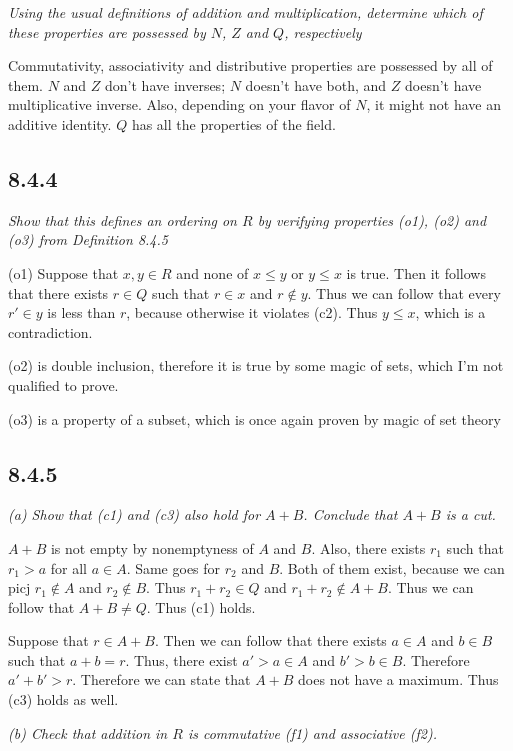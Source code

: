 \documentclass[11pt,oneside,titlepage]{book}
\begin{document}
\textit{Using the usual definitions of addition and multiplication, determine which of these
  properties are possessed by $N$, $Z$ and $Q$, respectively}

Commutativity, associativity and distributive properties are possessed by all of them. $N$
and $Z$ don't have inverses; $N$ doesn't have both, and $Z$ doesn't have multiplicative
inverse. Also, depending on your flavor of $N$, it might not have an additive identity.
$Q$ has all the properties of the field.

\subsection*{8.4.4}
\textit{Show that this defines an ordering on $R$ by verifying properties (o1), (o2) and (o3)
  from Definition 8.4.5}

(o1) Suppose that $x, y \in R$ and none of  $x \leq y$ or $y \leq x$ is true. Then it follows
that there exists $r \in Q$ such that  $r \in x$ and $r \notin y$. Thus we can follow that
every $r' \in y$ is less than $r$, because otherwise it violates (c2). Thus $y \leq x$, which
is a contradiction. 

(o2) is double inclusion, therefore it is true by some magic of sets, which I'm not qualified
to prove.

(o3) is a property of a subset, which is once again proven by magic of set theory

\subsection*{8.4.5}

\textit{(a) Show that (c1) and (c3) also hold for $A + B$. Conclude that $A + B$ is a
  cut.}

$A + B$ is not empty by nonemptyness of $A$ and $B$.
Also, there exists $r_1$ such that $r_1 > a$ for all $a \in A$. Same goes for $r_2$ and $B$.
Both of them exist, because we can picj $r_1 \notin A$ and $r_2 \notin B$.
Thus $r_1 + r_2 \in Q$ and $r_1 + r_2 \notin A + B$. Thus we can follow that $A + B \neq Q$. Thus
(c1) holds.

Suppose that $r \in A + B$. Then we can follow that there exists $a \in A$ and $b \in B$
such that $a + b = r$. Thus, there exist $a' > a \in A$ and $b' > b \in B$. Therefore
$a' + b' > r$. Therefore we can state that $A + B$ does not have a maximum. Thus (c3)
holds as well.

\textit{(b) Check that addition in $R$ is commutative (f1) and associative (f2).}
\end{document}

